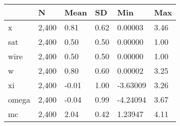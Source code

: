 \begin{table}[htbp]
\begin{tabular}{llllll} \hline \hline
 & N  & Mean  & SD  & Min  & Max  \\  \hline 
x &     2,400 &      0.81 &      0.62 &   0.00003 &      3.46 \\  
sat &     2,400 &      0.50 &      0.50 &   0.00000 &      1.00 \\  
wire &     2,400 &      0.50 &      0.50 &   0.00000 &      1.00 \\  
w &     2,400 &      0.80 &      0.60 &   0.00002 &      3.25 \\  
xi &     2,400 &     -0.01 &      1.00 &  -3.63009 &      3.26 \\  
omega &     2,400 &     -0.04 &      0.99 &  -4.24094 &      3.67 \\  
mc &     2,400 &      2.04 &      0.42 &   1.23947 &      4.11 \\  
\hline \hline \end{tabular}
\end{table}
